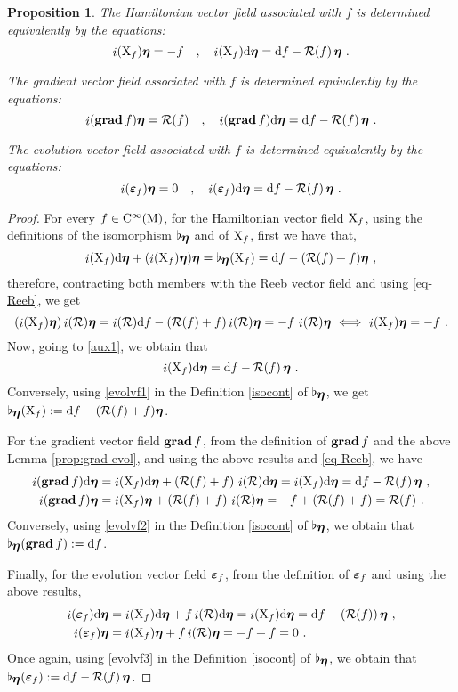 \documentclass[12pt]{report}
\newtheorem{prop}[teor]{Proposition}
\def\beq{\begin{equation}}
\def\eeq{\end{equation}}
\def\qed{\ifvmode\removelastskip\fi
{\unskip\nobreak\hfil\penalty50\hbox{}\nobreak\hfil
\hbox{\vrule height1.2ex width1.2ex}\parfillskip=0pt
\finalhyphendemerits=0 \par\smallskip}}
\def\d{{\rm d}}
\def\bmeta{\mbox{\boldmath $\eta$}}
\def\evo{\mbox{\boldmath $\varepsilon$}}
\def\X{{\rm X}}
\def\inn{\mathop{i}\nolimits}
\def\Cinfty{{\rm C}^\infty}
\newcommand{\Reeb}{\mathcal{R}}
\begin{document}
\begin{prop}
\label{GraHaEvProp}
The Hamiltonian vector field associated with $f$
is determined equivalently by the equations:
\beq
\inn(\X_f)\bmeta=-f \quad,\quad 
\inn(\X_f)\d\bmeta = \d f-\Reeb(f)\,\bmeta\ .
\label{evolvf1}
\eeq

The gradient vector field associated with $f$ is determined equivalently by the equations:
\beq
 \inn({\bf grad}\,f)\bmeta=\Reeb(f) 
 \quad ,\quad 
\inn({\bf grad}\,f)\d\bmeta=\d f-\Reeb(f)\,\bmeta\ .
\label{evolvf2}
\eeq

The evolution vector field  associated with $f$
is determined equivalently by the equations:
\beq
\inn(\evo_f)\bmeta=0 \quad ,\quad \inn(\evo_f)\d\bmeta=\d f-\Reeb(f)\,\bmeta\ .
\label{evolvf3}
\eeq
\end{prop}
\begin{proof}
For every $f\in\Cinfty({\rm M})$,
for the Hamiltonian vector field $\X_f$,
using the definitions of the isomorphism $\flat_{\bmeta}$ and of $\X_f$, first we have that,
\beq
\label{aux1}
\inn(\X_f)\d\bmeta+(\inn(\X_f)\bmeta)\bmeta=
\flat_{\bmeta}(\X_f)=\d f-(\Reeb(f)+f)\bmeta \ ,
\eeq
therefore, contracting both members with the Reeb vector field and using \eqref{eq-Reeb}, we get
$$
(\inn(\X_f)\bmeta)\inn(\Reeb)\bmeta=
\inn(\Reeb)\d f-(\Reeb(f)+f)\inn(\Reeb)\bmeta=
-f\,\inn(\Reeb)\bmeta
\ \Longleftrightarrow\ \inn(\X_f)\bmeta=-f \ .
$$
Now, going to \eqref{aux1}, we obtain that
$$
\inn(\X_f)\d\bmeta=\d f-\Reeb(f)\,\bmeta \ .
$$
Conversely, using \eqref{evolvf1}
in the Definition \eqref{isocont} of $\flat_{\bmeta}$,
we get $\flat_{\bmeta}(\X_f):=\d f-(\Reeb(f)+f)\bmeta$.

For the gradient vector field ${\bf grad}\,f$,
from the definition of ${\bf grad}\,f$ and the above Lemma \ref{prop:grad-evol},
and using the above results and \eqref{eq-Reeb}, we have
\begin{align*}
\inn({\bf grad}\,f)\d\bmeta &=
\inn(\X_f)\d\bmeta+(\Reeb(f)+f)\,\inn(\Reeb)\d\bmeta=
\inn(\X_f)\d\bmeta=\d f-\Reeb(f)\,\bmeta \ , 
\\
\inn({\bf grad}\,f)\bmeta&= 
\inn(\X_f)\bmeta+(\Reeb(f)+f)\,\inn(\Reeb)\bmeta=
-f+(\Reeb(f)+f)=\Reeb(f) \ .
\end{align*}
Conversely, using \eqref{evolvf2}
in the Definition \eqref{isocont} of $\flat_{\bmeta}$,
we obtain that $\flat_{\bmeta}({\bf grad}\, f):=\d f$.

Finally, for the evolution vector field $\evo_f$, from the definition of $\evo_f$ and using the above results,
 \begin{align*}
\inn(\evo_f)\d\bmeta&=\inn(\X_f)\d\bmeta+f\inn(\Reeb)\d\bmeta=\inn(\X_f)\d\bmeta=
\d f-(\Reeb(f))\,\bmeta \ ,
   \\
\inn(\evo_f)\bmeta &= \inn(\X_f)\bmeta+f\inn(\Reeb)\bmeta=-f+f=0\ .
 \end{align*}
Once again, using \eqref{evolvf3}
in the Definition \eqref{isocont} of $\flat_{\bmeta}$,
we obtain that $\flat_{\bmeta}(\evo_f):=\d f-\Reeb(f)\,\bmeta$.
\qed \end{proof}
\end{document}
